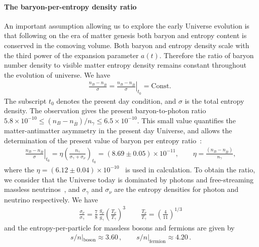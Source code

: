 \paragraph{The baryon-per-entropy density ratio}
An important assumption allowing us to explore the early Universe evolution is that following on the era of matter genesis both baryon and entropy content is conserved in the comoving volume. Both baryon and entropy density scale with the third power of the expansion parameter $a(t)$. Therefore the ratio of baryon number density to visible matter entropy density remains constant throughout the evolution of universe. We have 
\begin{align}
\frac{n_B-n_{\overline{B}}}{\sigma}= \left.\frac{n_B-n_{\overline{B}}}{ \sigma}\right|_{t_0}=\mathrm{Const.}\;
\end{align}
The subscript $t_0$ denotes the present day condition, and $\sigma$ is the total entropy density.
The observation gives the present baryon-to-photon ratio ~\cite{ParticleDataGroup:2022pth} $5.8 \times 10^{-10} \leqslant(n_B-n_{\overline{B}})/n_\gamma\leqslant6.5\times10^{-10}$. This small value quantifies the matter-antimatter asymmetry in the present day Universe, and allows the determination of the present value of baryon per entropy ratio~\cite{Rafelski:2019twp,Fromerth:2002wb,Fromerth:2012fe}:
\begin{align}\label{BaryonEntropyRatio}
\left.\frac{n_B-n_{\overline{B}}}{ \sigma}\right|_{t_0}=\eta\left(\frac{n_\gamma}{\sigma_\gamma+\sigma_\nu}\right)_{\!t_0}\!\!\!\!=(8.69\pm0.05)\!\!\times\!\!10^{-11},\qquad \eta=\frac{(n_B-n_{\overline{B}})}{n_\gamma},
\end{align}
where the $\eta=(6.12\pm0.04)\times10^{-10}$~\cite{ParticleDataGroup:2022pth} is used in calculation. To obtain the ratio, we consider that the Universe today is dominated by photons and free-streaming massless neutrinos~\cite{Birrell:2012gg}, and $\sigma_\gamma$ and $\sigma_\nu$ are the entropy densities for photon and neutrino respectively. We have
\begin{align}
    \frac{\sigma_\nu}{\sigma_\gamma}=\frac{7}{8}\,\frac{g_\nu}{g_\gamma}\left(\frac{T_\nu}{T_\gamma}\right)^3\,\qquad\frac{T_\nu}{T_\gamma}=\left(\frac{4}{11}\right)^{1/3}
\end{align}
and the entropy-per-particle for massless bosons and fermions are given by~\cite{Fromerth:2012fe}
\begin{align}
s/n|_\mathrm{boson}\approx 3.60\,,\qquad
s/n|_\mathrm{fermion}\approx 4.20\,.
\end{align}
